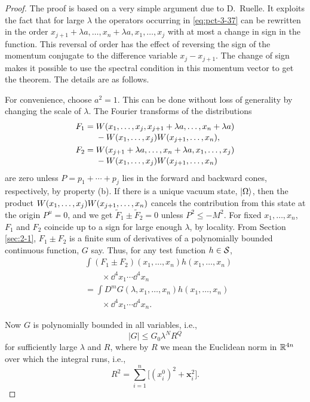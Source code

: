 \begin{proof}
The proof is based on a very simple argument due to D.~Ruelle. It exploits
the fact that for large $\lambda$ the operators occurring in \eqref{eq:pct-3-37} can be
rewritten in the order $x_{j+1}+\lambda a,\ldots,x_n+\lambda a,x_1,\ldots,x_j$
with at most a change in sign in the function. This reversal of order has
the effect of reversing the sign of the momentum conjugate to the difference
variable $x_j-x_{j+1}$. The change of sign makes it possible to use the
spectral condition in this momentum vector to get the theorem. The details
are as follows.

For convenience, choose $a^2=1$. This can be done without loss of
generality by changing the scale of $\lambda$. The Fourier transforms of the
distributions
\begin{align*}
 F_1={}&W(x_1,\ldots,x_j,x_{j+1}+\lambda a,\ldots,x_n+\lambda a)\\[-2pt]
 &-W(x_1,\ldots,x_j)W(x_{j+1},\ldots,x_n),\\
 F_2={}&W(x_{j+1}+\lambda a,\ldots,x_n+\lambda a,x_1,\ldots,x_j)\\[-2pt]
 &-W(x_1,\ldots,x_j)W(x_{j+1},\ldots,x_n)
\end{align*}
are zero unless $P=p_1+\cdots+p_j$ lies in the forward and backward cones,
respectively, by property (b). If there is a unique vacuum state,
$\lvert \Omega\rangle$, then the product
$W(x_1,\ldots,x_j)\allowbreak
W(x_{j+1},\ldots,x_n)$ cancels the contribution from this state at
the origin $P^\mu=0$, and we get
$\widetilde{F}_1\pm\widetilde{F}_2=0$ unless $P^2\leq -M^2$. For fixed
$x_1,\ldots,x_n$, $F_1$ and $F_2$ coincide up to a sign for large enough
$\lambda$, by locality. From Section \ref{sec:2-1}, $F_1\pm F_2$ is a finite sum of
derivatives of a polynomially bounded continuous function, $G$ say. Thus,
for any test function $h\in\mathcal{S}$,
\begin{equation*}
 \begin{aligned}
 &\int (F_1\pm F_2)(x_1,\ldots,x_n)h(x_1,\ldots,x_n)\\[-2pt]
 &\qquad\times\dd^4x_1\cdots\dd^4x_n\\
 &={ }\int D^mG(\lambda,x_1,\ldots,x_n)h(x_1,\ldots,x_n)\\[-2pt]
 &\qquad\times\dd^4x_1\cdots\dd^4x_n.
 \end{aligned}
\end{equation*}

Now $G$ is polynomially bounded in all variables, i.e.,
\begin{equation*}
 |G|\leq G_0\lambda^N R^Q
\end{equation*}
for sufficiently large $\lambda$ and $R$, where by $R$ we mean the
Euclidean norm in $\mathbb{R}^{4n}$ over which the integral runs, i.e.,
\begin{equation*}
 R^2=\sum_{i=1}^{n}\bigl[(x_i^0)^2+\mathbf{x}_i^2\bigr].
\end{equation*}


\end{proof}
